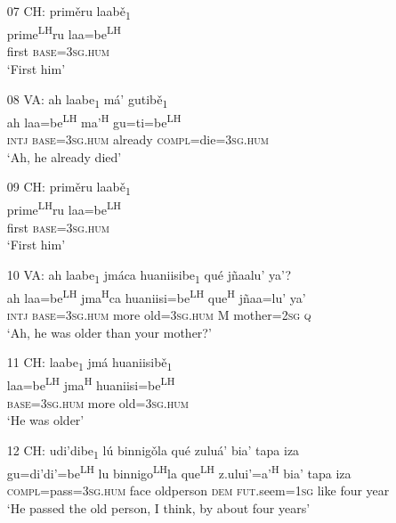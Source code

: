 \begin{itemize}
\item[07 CH:]
\glll prim\v{e}ru laab\v{e}\textsubscript{1}  \\                                    
prime\textsuperscript{LH}ru laa=be\textsuperscript{LH} \\
first \textsc{base}=\textsc{3sg.hum} \\
\glt `First him'


\item[08 VA:] 	
\glll ah laabe\textsubscript{1} m\'{a}' gutib\v{e}\textsubscript{1} \\
ah laa=be\textsuperscript{LH}  ma'\textsuperscript{H} gu=ti=be\textsuperscript{LH}   \\
\textsc{intj} \textsc{base}=\textsc{3sg.hum} already \textsc{compl}=die=\textsc{3sg.hum}  \\
\glt `Ah, he already died'


\item[09 CH:]
\glll prim\v{e}ru laab\v{e}\textsubscript{1}  \\                                    
prime\textsuperscript{LH}ru laa=be\textsuperscript{LH}   \\
first \textsc{base}=\textsc{3sg.hum}  \\
\glt `First him'


\item[10 VA:]
\glll ah laabe\textsubscript{1} jm\'{a}ca huaniisibe\textsubscript{1} qu\'{e} j\~{n}aalu' ya'?  \\
ah laa=be\textsuperscript{LH}  jma\textsuperscript{H}ca huaniisi=be\textsuperscript{LH}  que\textsuperscript{H} j\~{n}aa=lu' ya'  \\
\textsc{intj} \textsc{base}=\textsc{3sg.hum} more old=\textsc{3sg.hum} M mother=\textsc{2sg} \textsc{q}  \\
\glt `Ah, he was older than your mother?'


\item[11 CH:]
\glll laabe\textsubscript{1} jm\'{a} huaniisib\v{e}\textsubscript{1} \\
laa=be\textsuperscript{LH}  jma\textsuperscript{H} huaniisi=be\textsuperscript{LH}   \\
\textsc{base}=\textsc{3sg.hum} more old=\textsc{3sg.hum}  \\    	 
\glt `He was older'


\item[12 CH:]
\glll udi'dibe\textsubscript{1} l\'{u} binnig\v{o}la qu\'{e} zulu\'{a}' bia' tapa iza  \\
gu=di'di'=be\textsuperscript{LH}  lu binnigo\textsuperscript{LH}la que\textsuperscript{LH} z.ului'=a'\textsuperscript{H} bia' tapa iza  \\
\textsc{compl}=pass=\textsc{3sg.hum} face oldperson \textsc{dem} \textsc{fut}.seem=\textsc{1sg} like four year  \\
\glt `He passed the old person, I think, by about four years'



\end{itemize}
